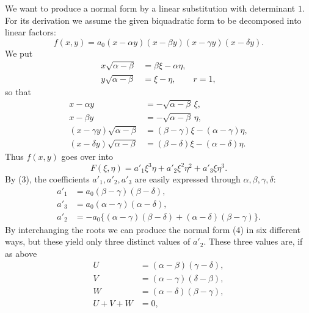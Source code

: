 \documentclass[11pt]{article}
\begin{document}
We want to produce a normal form by a linear substitution with determinant $1$. For its derivation we assume the given biquadratic form to be decomposed into linear factors:
\begin{equation}
 f(x,y)=a_0(x-\alpha y)(x-\beta y)(x-\gamma y)(x-\delta y).
\tag{1}
\end{equation}
We put
\begin{equation}
\begin{aligned}
 x\sqrt{\alpha-\beta}&=\beta\xi-\alpha\eta,\\
 y\sqrt{\alpha-\beta}&=\xi-\eta,
 \qquad r=1,
\end{aligned}
\tag{2}
\end{equation}
so that
\begin{equation}
\begin{aligned}
 x-\alpha y&=-\sqrt{\alpha-\beta}\,\xi,\\
 x-\beta y&=-\sqrt{\alpha-\beta}\,\eta,\\
 (x-\gamma y)\sqrt{\alpha-\beta}&=(\beta-\gamma)\xi-(\alpha-\gamma)\eta,\\
 (x-\delta y)\sqrt{\alpha-\beta}&=(\beta-\delta)\xi-(\alpha-\delta)\eta.
\end{aligned}
\tag{3}
\end{equation}
Thus $f(x,y)$ goes over into
\begin{equation}
 F(\xi,\eta)=a'_1\xi^3\eta+a'_2\xi^2\eta^2+a'_3\xi\eta^3.
\tag{4}
\end{equation}
By (3), the coefficients $a'_1,a'_2,a'_3$ are easily expressed through $\alpha,\beta,\gamma,\delta$:
\begin{equation}
\begin{aligned}
 a'_1&=a_0(\beta-\gamma)(\beta-\delta),\\
 a'_3&=a_0(\alpha-\gamma)(\alpha-\delta),\\
 a'_2&=-a_0\{(\alpha-\gamma)(\beta-\delta)+(\alpha-\delta)(\beta-\gamma)\}.
\end{aligned}
\tag{5}
\end{equation}
By interchanging the roots we can produce the normal form (4) in six different ways, but these yield only three distinct values of $a'_2$. These three values are, if as above
\begin{equation}
\begin{aligned}
 U&=(\alpha-\beta)(\gamma-\delta),\\
 V&=(\alpha-\gamma)(\delta-\beta),\\
 W&=(\alpha-\delta)(\beta-\gamma),\\
 U+V+W&=0,
\end{aligned}
\tag{6}
\end{equation}
\end{document}
